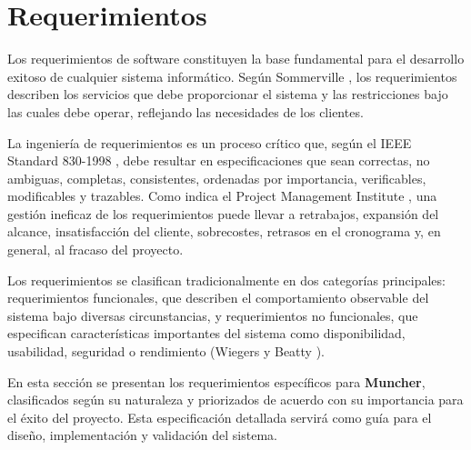 \section*{Requerimientos}

Los requerimientos de software constituyen la base fundamental para el desarrollo exitoso de cualquier sistema informático. Según Sommerville \cite{Sommerville2010}, los requerimientos describen los servicios que debe proporcionar el sistema y las restricciones bajo las cuales debe operar, reflejando las necesidades de los clientes.

La ingeniería de requerimientos es un proceso crítico que, según el IEEE Standard 830-1998 \cite{IEEE830-1998}, debe resultar en especificaciones que sean correctas, no ambiguas, completas, consistentes, ordenadas por importancia, verificables, modificables y trazables. Como indica el Project Management Institute \cite{PMI2021}, una gestión ineficaz de los requerimientos puede llevar a retrabajos, expansión del alcance, insatisfacción del cliente, sobrecostes, retrasos en el cronograma y, en general, al fracaso del proyecto.

Los requerimientos se clasifican tradicionalmente en dos categorías principales: requerimientos funcionales, que describen el comportamiento observable del sistema bajo diversas circunstancias, y requerimientos no funcionales, que especifican características importantes del sistema como disponibilidad, usabilidad, seguridad o rendimiento (Wiegers y Beatty \cite{Wiegers2013}).

En esta sección se presentan los requerimientos específicos para \textbf{Muncher}, clasificados según su naturaleza y priorizados de acuerdo con su importancia para el éxito del proyecto. Esta especificación detallada servirá como guía para el diseño, implementación y validación del sistema.

